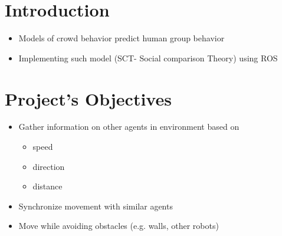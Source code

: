 \documentclass[a0,portrait]{a0poster}
\begin{document}
\begin{multicols}{2} %






\color{Black} %
\section*{Introduction}
\begin{itemize}
\item Models of crowd behavior predict human group behavior
\item Implementing such model (SCT- Social comparison Theory) using ROS
\end{itemize}



\color{Black} %
\section*{Project's Objectives}
%
\begin{itemize}
\item Gather information on other agents in environment based on
\begin{itemize}
\item speed
\item direction
\item distance
\end{itemize}
\item Synchronize movement with similar agents
\item Move while avoiding obstacles (e.g. walls, other robots)
\end{itemize}


\end{multicols}
\end{document}
